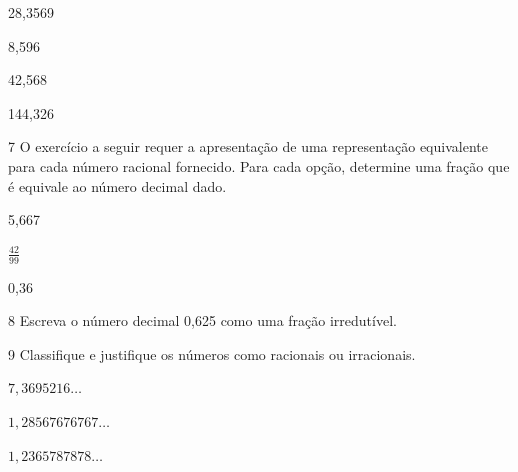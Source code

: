 \begin{escolha}[itemsep=0pt]

    \item 28,3569 

    \item 8,596 
    
    \item 42,568 
    
    \item 144,326 

\end{escolha}

\pagebreak

\num{7} O exercício a seguir requer a apresentação de uma representação
 equivalente para cada número racional fornecido. Para cada opção, determine
 uma fração que é equivale ao número decimal dado.

\begin{escolha}[itemsep=0pt]

    \item 5,667  

    \item $\frac{42}{99}$  

    \item 0,36  

\end{escolha}

\num{8} Escreva o número decimal 0,625 como uma fração irredutível.



\num{9} Classifique e justifique os números como racionais ou irracionais.

\begin{escolha}[itemsep=-5mm]
    \item $7,3695216\ldots{}$
    \item $1,28567676767\ldots{}$
  
    \item $1,2365787878\ldots{}$
\end{escolha}

